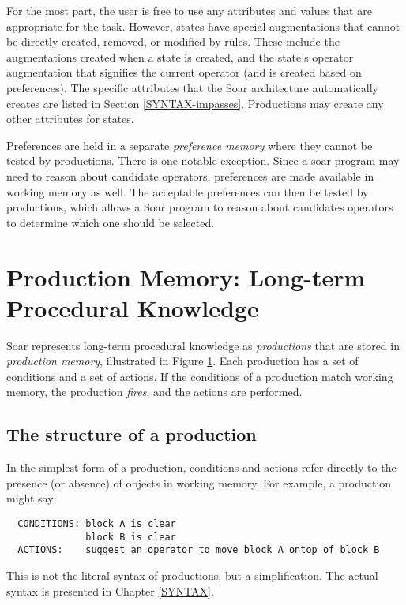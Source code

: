 For the most part, the user is free to use any attributes and values
that are appropriate for the task. However, states have special
augmentations that cannot be directly created, removed, or modified by
rules.  These include the augmentations created when a state is created,
and the state's operator augmentation that signifies the current
operator (and is created based on preferences).  The specific
attributes that the Soar architecture automatically creates are listed in Section
\ref{SYNTAX-impasses}. Productions may create any other attributes for
states.

Preferences are held in a separate \emph{preference memory} where they cannot be tested by productions.  There is one notable exception.  Since a soar program may need to reason about candidate operators,  preferences are made available in working memory as well. The acceptable preferences can then be tested by productions, which allows a Soar program to reason about candidates operators to determine which one should be selected.

\section{Production Memory: Long-term Procedural Knowledge} 
\label{ARCH-pm}

\begin{figure}
\label{fig:ab-prodmem}
\end{figure}

Soar represents long-term procedural knowledge as \emph{productions} that are stored in
\emph{production memory}, illustrated in Figure \ref{fig:ab-prodmem}. Each
production has a set of conditions and a set of actions.  If the
conditions of a production match working memory, the production
\emph{fires}, and the actions are performed.

\subsection{The structure of a production}
\label{ARCH-pm-structure}

In the simplest form of a production, conditions and actions refer directly to
the presence (or absence) of objects in working memory. For example, a
production might say:
\begin{verbatim}
  CONDITIONS: block A is clear 
              block B is clear 
  ACTIONS:    suggest an operator to move block A ontop of block B
\end{verbatim}
This is not the literal syntax of productions, but a simplification.
The actual syntax is presented in Chapter \ref{SYNTAX}.

